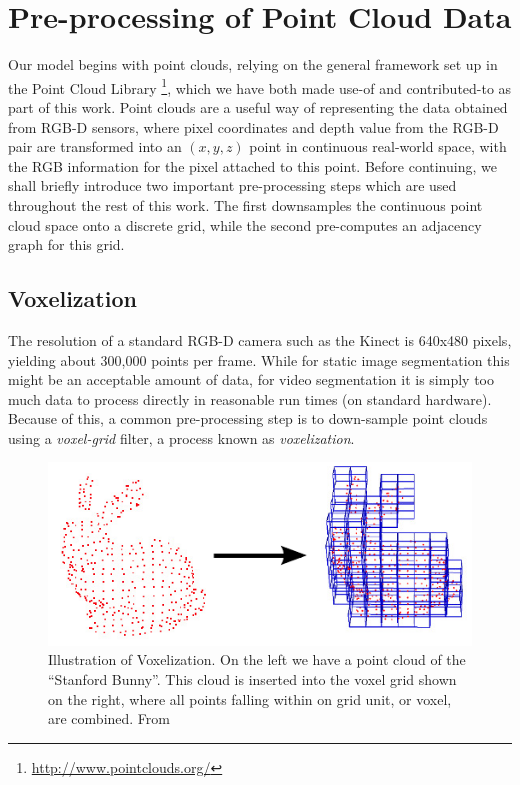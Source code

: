 \section{Pre-processing of Point Cloud Data}
Our model begins with point clouds, relying on the general framework set up in the Point Cloud Library \footnote{\url{http://www.pointclouds.org/}}, which we have both made use-of and contributed-to as part of this work. Point clouds are a useful way of representing the data obtained from RGB-D sensors, where pixel coordinates and depth value from the RGB-D pair are transformed into an $(x,y,z)$ point in continuous real-world space, with the RGB information for the pixel attached to this point. Before continuing, we shall briefly introduce two important pre-processing steps which are used throughout the rest of this work. The first downsamples the continuous point cloud space onto a discrete grid, while the second pre-computes an adjacency graph for this grid.

\subsection{Voxelization}
The resolution of a standard RGB-D camera such as the Kinect is 640x480 pixels, yielding about 300,000 points per frame. While for static image segmentation this might be an acceptable amount of data, for video segmentation it is simply too much data to process directly in reasonable run times (on standard hardware). Because of this, a common pre-processing step is to down-sample point clouds using a \textit{voxel-grid} filter, a process known as \textit{voxelization}. 

\begin{figure}[!t]
\begin{center}
\includegraphics[width=0.8\linewidth]{figures/WorldModel/stanford_bunny.png}
\end{center}
   \caption[Example of Voxelization]{Illustration of Voxelization. On the left we have a point cloud of the ``Stanford Bunny''. This cloud is inserted into the voxel grid shown on the right, where all points falling within on grid unit, or voxel, are combined. From \cite{PCLWebsite}}
\label{fig:stanford_bunny}
\end{figure}

